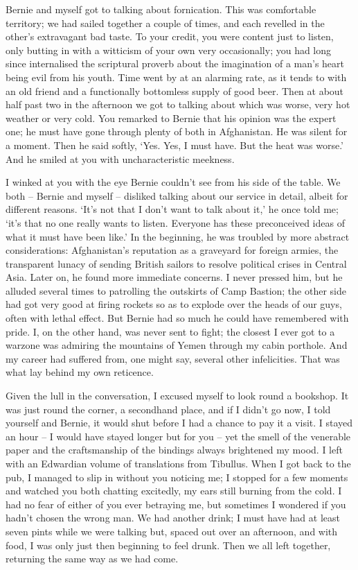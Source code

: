 Bernie and myself got to talking about fornication. This was comfortable territory; we had sailed together a couple of times, and each revelled in the other's extravagant bad taste. To your credit, you were content just to listen, only butting in with a witticism of your own very occasionally; you had long since internalised the scriptural proverb about the imagination of a man's heart being evil from his youth. Time went by at an alarming rate, as it tends to with an old friend and a functionally bottomless supply of good beer. Then at about half past two in the afternoon we got to talking about which was worse, very hot weather or very cold. You remarked to Bernie that his opinion was the expert one; he must have gone through plenty of both in Afghanistan. He was silent for a moment. Then he said softly, `Yes. Yes, I must have. But the heat was worse.' And he smiled at you with uncharacteristic meekness.

I winked at you with the eye Bernie couldn't see from his side of the table. We both -- Bernie and myself -- disliked talking about our service in detail, albeit for different reasons. `It's not that I don't want to talk about it,' he once told me; `it's that no one really wants to listen. Everyone has these preconceived ideas of what it must have been like.' In the beginning, he was troubled by more abstract considerations: Afghanistan's reputation as a graveyard for foreign armies, the transparent lunacy of sending British sailors to resolve political crises in Central Asia. Later on, he found more immediate concerns. I never pressed him, but he alluded several times to patrolling the outskirts of Camp Bastion; the other side had got very good at firing rockets so as to explode over the heads of our guys, often with lethal effect. But Bernie had so much he could have remembered with pride. I, on the other hand, was never sent to fight; the closest I ever got to a warzone was admiring the mountains of Yemen through my cabin porthole. And my career had suffered from, one might say, several other infelicities. That was what lay behind my own reticence.

Given the lull in the conversation, I excused myself to look round a bookshop. It was just round the corner, a secondhand place, and if I didn't go now, I told yourself and Bernie, it would shut before I had a chance to pay it a visit. I stayed an hour -- I would have stayed longer but for you -- yet the smell of the venerable paper and the craftsmanship of the bindings always brightened my mood. I left with an Edwardian volume of translations from Tibullus. When I got back to the pub, I managed to slip in without you noticing me; I stopped for a few moments and watched you both chatting excitedly, my ears still burning from the cold. I had no fear of either of you ever betraying me, but sometimes I wondered if you hadn't chosen the wrong man. We had another drink; I must have had at least seven pints while we were talking but, spaced out over an afternoon, and with food, I was only just then beginning to feel drunk. Then we all left together, returning the same way as we had come.

